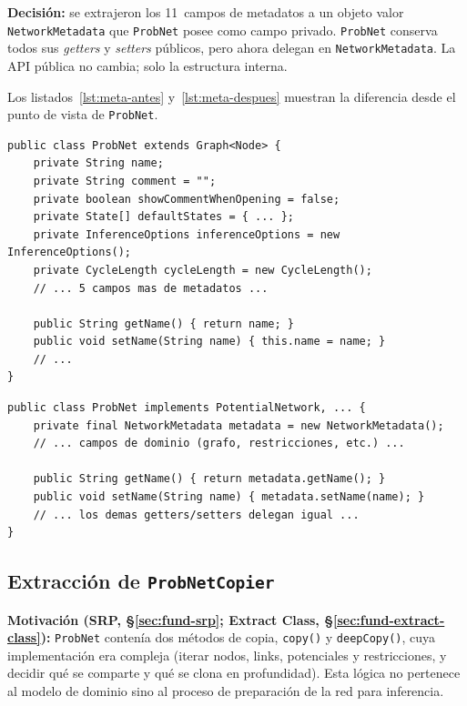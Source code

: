 \documentclass[11pt,a4paper]{article}
\newcommand{\code}[1]{\texttt{#1}}
\begin{document}
\textbf{Decisión:} se extrajeron los 11~campos de metadatos a un objeto
valor \code{NetworkMetadata} que \code{ProbNet} posee como campo privado.
\code{ProbNet} conserva todos sus \emph{getters} y \emph{setters}
públicos, pero ahora delegan en \code{NetworkMetadata}.  La API pública
no cambia; solo la estructura interna.

Los listados~\ref{lst:meta-antes} y~\ref{lst:meta-despues} muestran la
diferencia desde el punto de vista de \code{ProbNet}.

\begin{lstlisting}[caption={Antes: campo \texttt{name} directamente en \texttt{ProbNet}.},
                   label=lst:meta-antes]
public class ProbNet extends Graph<Node> {
    private String name;
    private String comment = "";
    private boolean showCommentWhenOpening = false;
    private State[] defaultStates = { ... };
    private InferenceOptions inferenceOptions = new InferenceOptions();
    private CycleLength cycleLength = new CycleLength();
    // ... 5 campos mas de metadatos ...

    public String getName() { return name; }
    public void setName(String name) { this.name = name; }
    // ...
}
\end{lstlisting}

\begin{lstlisting}[caption={Después: metadatos delegados a \texttt{NetworkMetadata}.},
                   label=lst:meta-despues]
public class ProbNet implements PotentialNetwork, ... {
    private final NetworkMetadata metadata = new NetworkMetadata();
    // ... campos de dominio (grafo, restricciones, etc.) ...

    public String getName() { return metadata.getName(); }
    public void setName(String name) { metadata.setName(name); }
    // ... los demas getters/setters delegan igual ...
}
\end{lstlisting}

\subsection{Extracción de \texttt{ProbNetCopier}}
\label{sec:copier}

\textbf{Motivación (SRP, §\ref{sec:fund-srp}; Extract Class,
§\ref{sec:fund-extract-class}):}
\code{ProbNet} contenía dos métodos de copia, \code{copy()} y
\code{deepCopy()}, cuya implementación era compleja (iterar nodos,
links, potenciales y restricciones, y decidir qué se comparte y qué se
clona en profundidad).  Esta lógica no pertenece al modelo de dominio
sino al proceso de preparación de la red para inferencia.
\end{document}
